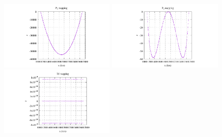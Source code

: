 \begin{center}
\includegraphics[width=5.7cm]{images/mappings/DJ/quadrilaterals/xz_P1_boundary_error.pdf}
\includegraphics[width=5.7cm]{images/mappings/DJ/quadrilaterals/xz_P2_boundary_error.pdf}
\includegraphics[width=5.7cm]{images/mappings/DJ/quadrilaterals/xz_DJ_boundary_error.pdf}
\end{center}






 
